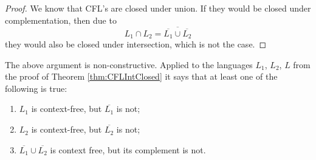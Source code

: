 

\setcounter{section}{7}
\setcounter{subsection}{3}
\setcounter{dfn}{8}

\begin{proof}
We know that CFL's are closed under union.
If they would be closed under complementation, then due to
\[
L_1 \cap L_2 = \overline{\overline{L_1} \cup \overline{L_2}}
\]
they would also be closed under intersection, which is not the case.
\end{proof}

The above argument is non-constructive.
Applied to the languages $L_1$, $L_2$, $L$ from the proof of Theorem \ref{thm:CFLIntClosed} it says that at least one of the following is true:
\begin{enumerate}
\item $L_1$ is context-free, but $\overline{L_1}$ is not;
\item $L_2$ is context-free, but $\overline{L_2}$ is not;
\item $\overline{L_1} \cup \overline{L_2}$ is context free, but its complement is not.
\end{enumerate}



